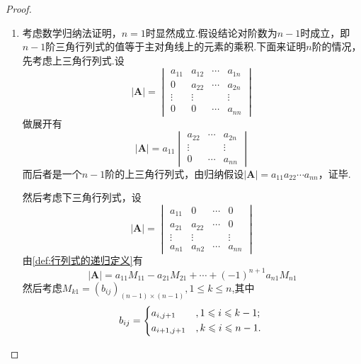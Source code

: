 {\begin{proof}
\begin{enumerate}[label = {\textup{(\arabic*)}}]
            \item 考虑数学归纳法证明，$n=1$时显然成立.假设结论对阶数为$n-1$时成立，即$n-1$阶三角行列式的值等于主对角线上的元素的乘积.下面来证明$n$阶的情况，先考虑上三角行列式.设\[
                      \left|\bm{A}\right|=\begin{vmatrix}
                          a_{11} & a_{12} & \cdots & a_{1n} \\
                          0      & a_{22} & \cdots & a_{2n} \\
                          \vdots & \vdots &        & \vdots \\
                          0      & 0      & \cdots & a_{nn}
                      \end{vmatrix}
                  \]做展开有\[
                      \left|\bm{A}\right|=a_{11}\begin{vmatrix}
                          a_{22} & \cdots & a_{2n} \\
                          \vdots &        & \vdots \\
                          0      & \cdots & a_{nn}
                      \end{vmatrix}
                  \]而后者是一个$n-1$阶的上三角行列式，由归纳假设$\left|\bm{A}\right|=a_{11}a_{22}\cdots a_{nn}$，证毕.

                  然后考虑下三角行列式，设\[
                      \left|\bm{A}\right|= \begin{vmatrix}
                          a_{11} & 0      & \cdots & 0      \\
                          a_{21} & a_{22} & \cdots & 0      \\
                          \vdots & \vdots &        & \vdots \\
                          a_{n1} & a_{n2} & \cdots & a_{nn}
                      \end{vmatrix}
                  \]由\cref{def:行列式的递归定义}有\[
                      \left|\bm{A}\right|=a_{11}M_{11}-a_{21}M_{21}+\cdots+(-1)^{n+1}a_{n1}M_{n1}
                  \]然后考虑$M_{k1}=\left(
                      b_{ij}
                      \right)_{\left(n-1\right)\times \left(n-1\right)},1\leqslant k\leqslant n$,其中\[
                      b_{ij}=
                      \begin{cases*}
                          a_{i,j+1}   & $,1\leqslant i\leqslant k-1;$   \\
                          a_{i+1,j+1} & $,k\leqslant i\leqslant   n-1.$
                      \end{cases*}
                  \]


\end{enumerate}
\end{proof}}
